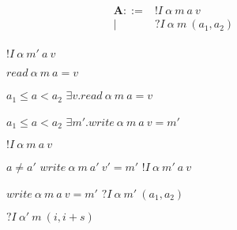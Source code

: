 \documentclass{article}
\begin{document}
\begin{figure}
  \begin{minipage}{0.33\textwidth}
    \[\begin{split}
    \mathbf{A} ::= & ! I ~ \alpha ~ m ~ a ~ v \\
    |& ? I ~ \alpha ~ m ~ (a_1,a_2) \\
    \end{split}\]
  \end{minipage}
  \begin{minipage}{0.33\textwidth}
             {\(! I ~ \alpha ~ m' ~ a ~ v\)}
  \end{minipage}
  \begin{minipage}{0.33\textwidth}
             {\(\mathit{read} ~ \alpha ~ m ~ a = v\)}
  \end{minipage}
  \begin{minipage}{0.33\textwidth}
                {\(a_1 \leq a < a_2\)}
                {\(\exists v . \mathit{read} ~ \alpha ~ m ~ a = v\)}
  \end{minipage}
  \begin{minipage}{0.33\textwidth}
                {\(a_1 \leq a < a_2\)}
                {\(\exists m' . \mathit{write} ~ \alpha ~ m ~ a ~ v = m'\)}
  \end{minipage}
  \begin{minipage}{0.33\textwidth}
             {\(! I ~ \alpha ~ m ~ a ~ v\)}
  \end{minipage}
  \begin{minipage}{0.33\textwidth}
                      {\(a \not = a'\)}
                      {\(\mathit{write} ~ \alpha ~ m ~ a' ~ v' = m'\)}
                      {\(! I ~ \alpha ~ m' ~ a ~ v\)}
  \end{minipage}
  \begin{minipage}{0.33\textwidth}
               {\(\mathit{write} ~ \alpha ~ m ~ a ~ v = m'\)}
               {\(? I ~ \alpha ~ m' ~ (a_1,a_2)\)}
  \end{minipage}
  \begin{minipage}{0.33\textwidth}
             {\(? I ~ \alpha' ~ m ~ (i,i+s)\)}
  \end{minipage}

\end{figure}
\end{document}
